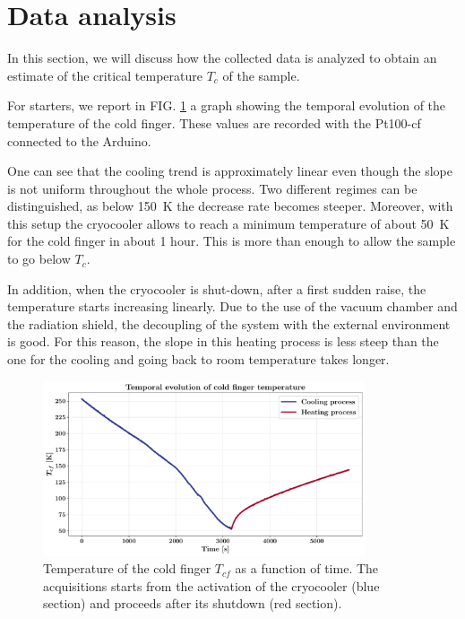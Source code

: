 \documentclass[rmp,10pt,onecolumn,fleqn,notitlepage]{revtex4-1}
\begin{document}
\clearpage

\section{Data analysis}
\label{sec:data_analysis}

In this section, we will discuss how the collected data is analyzed to obtain an estimate of the critical temperature $T_c$ of the sample.

\medskip

For starters, we report in FIG. \ref{fig:cool} a graph showing the temporal evolution of the temperature of the cold finger. These values are recorded with the Pt100-cf connected to the Arduino.

One can see that the cooling trend is approximately linear even though the slope is not uniform throughout the whole process. Two different regimes can be distinguished, as below \SI{150}{\kelvin} the decrease rate becomes steeper. 
Moreover, with this setup the cryocooler allows to reach a minimum temperature of about \SI{50}{\kelvin} for the cold finger in about 1 hour. This is more than enough to allow the sample to go below $T_c$. 

In addition, when the cryocooler is shut-down, after a first sudden raise, the temperature starts increasing linearly. 
Due to the use of the vacuum chamber and the radiation shield, the decoupling of the system with the external environment is good. For this reason, the slope in this heating process is less steep than the one for the cooling and going back to room temperature takes longer. 

\begin{figure}[h!]
    \centering
    \includegraphics[width=0.85\textwidth]{image/arduino_plots/temporal_evolution_cold_finger.pdf}
    \caption{Temperature of the cold finger $T_{cf}$ as a function of time. The acquisitions starts from the activation of the cryocooler (blue section) and proceeds after its shutdown (red section).}
    \label{fig:cool}
\end{figure}
\end{document}
